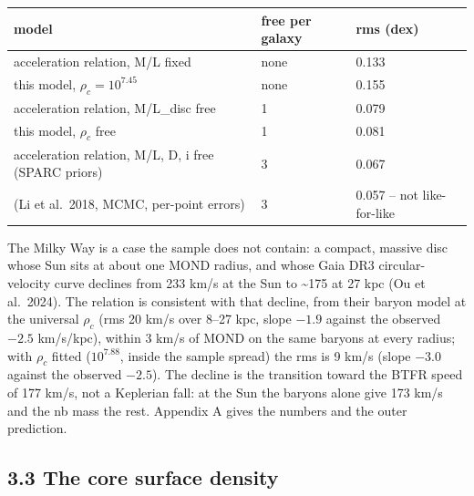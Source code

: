 \documentclass[
  10pt,
]{article}
\begin{document}
\begin{longtable}[]{@{}lll@{}}
\toprule
model & free per galaxy & rms (dex)\tabularnewline
\midrule
\endhead
acceleration relation, M/L fixed & none & 0.133\tabularnewline
this model, $\rho_c=10^{7.45}$ & none & 0.155\tabularnewline
acceleration relation, M/L\_disc free & 1 & 0.079\tabularnewline
this model, $\rho_c$ free & 1 & 0.081\tabularnewline
acceleration relation, M/L, D, i free (SPARC priors) & 3 &
0.067\tabularnewline
(Li et al.~2018, MCMC, per-point errors) & 3 & 0.057 -- not
like-for-like\tabularnewline
\bottomrule
\end{longtable}

The Milky Way is a case the sample does not contain: a compact, massive disc whose Sun sits at about one MOND radius, and whose Gaia DR3 circular-velocity curve declines from 233 km/s at the Sun to \textasciitilde{}175 at 27 kpc (Ou et al.~2024). The relation is consistent with that decline, from their baryon model at the universal $\rho_c$ (rms 20 km/s over 8--27 kpc, slope $-1.9$ against the observed $-2.5$ km/s/kpc), within 3 km/s of MOND on the same baryons at every radius; with $\rho_c$ fitted ($10^{7.88}$, inside the sample spread) the rms is 9 km/s (slope $-3.0$ against the observed $-2.5$). The decline is the transition toward the BTFR speed of 177 km/s, not a Keplerian fall: at the Sun the baryons alone give 173 km/s and the nb mass the rest. Appendix A gives the numbers and the outer prediction.

\subsection{3.3 The core surface density}\label{the-core-surface-density}
\end{document}
